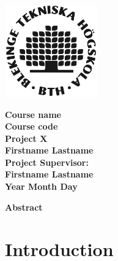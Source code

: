 \documentclass{report}
\begin{document}
\thispagestyle{empty}

\vspace*{-1cm}\hspace{-0.75cm}\includegraphics[width=0.3\textwidth, right]{bth-logo.png} %
\vspace{3cm}
\begin{center}
{\Huge\textbf{Course name}} \\ %
\vspace{0.25cm}
{\Huge\textbf{Course code}} \\ %
\vspace{0.5cm}
{\huge\textbf{Project X}} \\ %
\vspace{3.5cm}
{\huge\textbf{Firstname Lastname}} \\ %
\vspace{5cm}
{\LARGE\textbf{Project Supervisor:}} \\
{\LARGE\textbf{Firstname Lastname}} \\ %
\vspace{1cm}
{\Large\textbf{Year Month Day}} %
\end{center}

\vspace*{3.5cm}
\centerline{\Huge\textbf{Abstract}}
\vspace{1cm}
\noindent
\blindtext[2] %

\tableofcontents
\newpage

\pagestyle{fancy}

\chapter{Introduction}
\noindent
\blindtext[2] %
\end{document}
